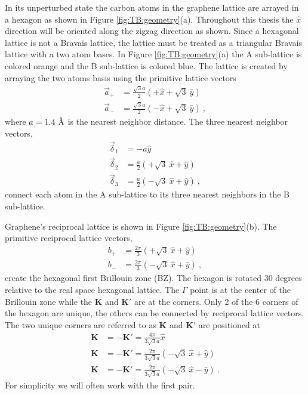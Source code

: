In its unperturbed state the carbon atoms in the graphene lattice are arrayed in a hexagon as shown in Figure \ref{fig:TB:geometry}(a).
Throughout this thesis the $\hat x$ direction will be oriented along the zigzag direction as shown.
Since a hexagonal lattice is not a Bravais lattice, the lattice must be treated as a triangular Bravais lattice with a two atom bases.
In Figure \ref{fig:TB:geometry}(a) the A sub-lattice is colored orange and the B sub-lattice is colored blue.
The lattice is created by arraying the two atoms basis using the primitive lattice vectors 
\begin{align*}
	\vec{a}_+&= \frac{\sqrt{3}a}{2} \left( +\hat{x} + \sqrt{3} \ \hat{y} \right) \\
	\vec{a}_-&= \frac{\sqrt{3}a}{2} \left( -\hat{x} + \sqrt{3} \ \hat{y} \right) \ ,
\end{align*}
where $a=1.4 \ \textup{\AA}$ is the nearest neighbor distance.
The three nearest neighbor vectors,
\begin{align*}
	\vec \delta_1&=-a \hat{y} \\
	\vec \delta_2&= \frac{a}{2} \left( +\sqrt{3} \ \hat{x}+\hat{y} \right)\\
	\vec \delta_3&= \frac{a}{2} \left( -\sqrt{3} \ \hat{x}+\hat{y} \right) \ ,
\end{align*}
connect each atom in the A sub-lattice to its three nearest neighbors in the B sub-lattice.

Graphene's reciprocal lattice is shown in Figure \ref{fig:TB:geometry}(b).
The primitive reciprocal lattice vectors, 
\begin{align*}
	b_+&=\frac{2 \pi}{3} \left(+\sqrt{3} \ \hat{x} + \hat{y} \right) \\ 
	b_-&=\frac{2 \pi}{3} \left(-\sqrt{3} \ \hat{x} + \hat{y} \right) \ ,
\end{align*} 
create the hexagonal first Brillouin zone (BZ).
The hexagon is rotated 30 degrees relative to the real space hexagonal lattice.
The $\Gamma$ point is at the center of the Brillouin zone while the $\bm{K}$ and $\bm{K'}$ are at the corners.
Only 2 of the 6 corners of the hexagon are unique, the others can be connected by reciprocal lattice vectors.
The two unique corners are referred to as $\bm{K}$ and $\bm{K'}$ are positioned at
\begin{align*}
	\bm{K}&=-\bm{K'}= \frac{4 \pi}{3 \sqrt{3} a} \hat{x} \\
	\bm{K}&=-\bm{K'}= \frac{2 \pi}{3 \sqrt{3} a} \left( -\sqrt{3} \ \hat{x} + \hat{y} \right)\\
	\bm{K}&=-\bm{K'}= \frac{2 \pi}{3 \sqrt{3} a} \left( -\sqrt{3} \ \hat{x} - \hat{y} \right) \ .
\end{align*}
For simplicity we will often work with the first pair.

